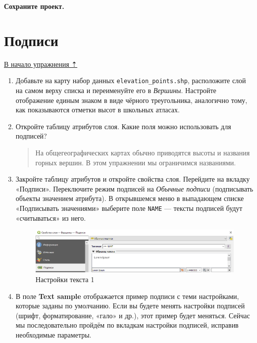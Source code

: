 \documentclass[
  12pt,
]{book}
\begin{document}
\textbf{Сохраните проект.}

\hypertarget{map-design-general-labels}{%
\section{Подписи}\label{map-design-general-labels}}

\protect\hyperlink{map-design-general}{В начало упражнения ⇡}

\begin{enumerate}
\def\labelenumi{\arabic{enumi}.}
\item
  Добавьте на карту набор данных \texttt{elevation\_points.shp}, расположите слой на самом верху списка и переименуйте его в \emph{Вершины}. Настройте отображение единым знаком в виде чёрного треугольника, аналогично тому, как показываются отметки высот в школьных атласах.
\item
  Откройте таблицу атрибутов слоя. Какие поля можно использовать для подписей?

  \begin{quote}
  На общегеографических картах обычно приводятся высоты и названия горных вершин. В этом упражнении мы ограничимся названиями.
  \end{quote}
\item
  Закройте таблицу атрибутов и откройте свойства слоя. Перейдите на вкладку «Подписи». Переключите режим подписей на \emph{Обычные подписи} (подписывать объекты значением атрибута). В открывшемся меню в выпадающем списке «Подписывать значениями» выберите поле \texttt{NAME} --- тексты подписей будут «считываться» из него.

  \begin{figure}
  \centering
  \includegraphics{images/Ex01/text1.png}
  \caption{Настройки текста 1}
  \end{figure}
\item
  В поле \textbf{Text sample} отображается пример подписи с теми настройками, которые заданы по умолчанию. Если вы будете менять настройки подписей (шрифт, форматирование, «гало» и др.), этот пример будет меняться. Сейчас мы последовательно пройдём по вкладкам настройки подписей, исправив необходимые параметры.


\end{enumerate}
\end{document}
